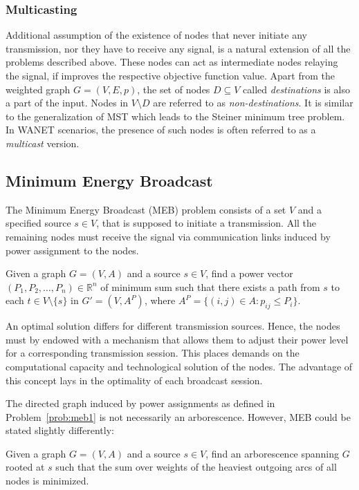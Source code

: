 \subsubsection{Multicasting}

Additional assumption of the existence of nodes that never initiate any transmission, nor they have to receive any signal, is a natural extension of all the problems described above.
These nodes can act as intermediate nodes relaying the signal, if improves the respective objective function value.
Apart from the weighted graph $G=(V,E,p)$, the set of nodes $D\subseteq V$ called \emph{destinations} is also a part of the input.
Nodes in $V\setminus D$ are referred to as \emph{non-destinations}.
It is similar to the generalization of MST which leads to the Steiner minimum tree problem.
In WANET scenarios, the presence of such nodes is often referred to as a \emph{multicast} version.

\subsection{Minimum Energy Broadcast}

The Minimum Energy Broadcast (MEB) problem consists of a set $V$ and a specified source $s\in V$, that is supposed to initiate a transmission.
All the remaining nodes must receive the signal via communication links induced by power assignment to the nodes.
\begin{problem}\label{prob:meb1}
Given a graph $G=(V,A)$ and a source $s\in V$, find a power vector $(P_1,P_2,\dots,P_n)\in\mathbb{R}^n$ of minimum sum such that
there exists a path from $s$ to each $t\in V\setminus\{s\}$ in $G'=(V,A^P)$, where $A^P=\{(i,j)\in A: p_{ij}\leq P_i\}$.
\end{problem}
An optimal solution differs for different transmission sources.
Hence, the nodes must by endowed with a mechanism that allows them to adjust their power level for a corresponding transmission session.
This places demands on the computational capacity and technological solution of the nodes.
The advantage of this concept lays in the optimality of each broadcast session.

The directed graph induced by power assignments as defined in Problem~\ref{prob:meb1} is not necessarily an arborescence.
However, MEB could be stated slightly differently:
\begin{problem}\label{prob:meb2}
Given a graph $G=(V,A)$ and a source $s\in V$, find an arborescence spanning $G$ rooted at $s$ such that 
the sum over weights of the heaviest outgoing arcs of all nodes is minimized.
\end{problem}

